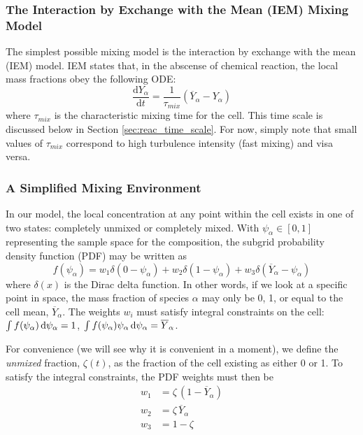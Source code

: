 \subsubsection{The Interaction by Exchange with the Mean (IEM) Mixing Model}

The simplest possible mixing model is the interaction by exchange with the mean (IEM) model.  IEM states that, in the abscense of chemical reaction, the local mass fractions obey the following ODE:
\begin{equation}\label{eq:iem}
\frac{\mbox{d}Y_\alpha}{\mbox{d}t} = \frac{1}{\tau_{mix}}(\overline{Y}_\alpha - Y_\alpha)
\end{equation}
where $\tau_{mix}$ is the characteristic mixing time for the cell.  This time scale is discussed below in Section \ref{sec:reac_time_scale}.  For now, simply note that small values of $\tau_{mix}$ correspond to high turbulence intensity (fast mixing) and visa versa.

\subsubsection{A Simplified Mixing Environment}

In our model, the local concentration at any point within the cell exists in one of two states: completely unmixed or completely mixed.  With $\psi_\alpha \in [0,1]$ representing the sample space for the composition, the subgrid probability density function (PDF) may be written as
\begin{equation}
\label{eq:pdf}
f(\psi_\alpha) = w_1 \delta(0-\psi_\alpha) + w_2 \delta(1-\psi_\alpha) + w_3 \delta(\overline{Y}_\alpha - \psi_\alpha)
\end{equation}
where $\delta(x)$ is the Dirac delta function.  In other words, if we look at a specific point in space, the mass fraction of species $\alpha$ may only be 0, 1, or equal to the cell mean, $\overline{Y}_\alpha$.  The weights $w_i$ must satisfy integral constraints on the cell: $\int f(\psi_\alpha) \,\mathrm{d} \psi_\alpha = 1$, $\int f(\psi_\alpha) \psi_\alpha \,\mathrm{d} \psi_\alpha = \overline{Y}_\alpha$.

For convenience (we will see why it is convenient in a moment), we define the \emph{unmixed} fraction, $\zeta(t)$, as the fraction of the cell existing as either 0 or 1.  To satisfy the integral constraints, the PDF weights must then be
\begin{align}
w_1 &= \zeta \, (1 - \overline{Y}_\alpha) \\
w_2 &= \zeta \, \overline{Y}_\alpha \\
w_3 &= 1-\zeta
\end{align}

